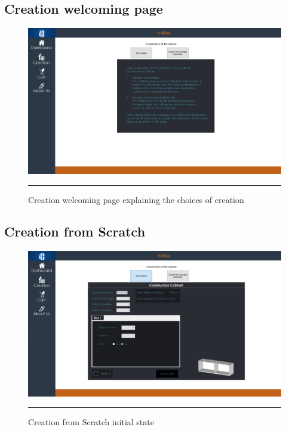 	\newpage
	\subsection{Creation welcoming page}
    	\vfill
        \begin{figure}[h!]
            \centering
    		\includegraphics[width =1.2\textwidth,angle = 90]{Figures/creationWelcome.PNG}
    		\rule{35em}{0.5pt}
    		\caption{Creation welcoming page explaining the choices of creation}
    		\label{welcomtab}
    	\end{figure}
    	\vfill
    	
	\newpage
	\subsection{Creation from Scratch}
    	\vfill
        \begin{figure}[h!]
            \centering
    		\includegraphics[width =1.2\textwidth,angle = 90]{Figures/CreationScratch.PNG}
    		\rule{35em}{0.5pt}
    		\caption{Creation from Scratch initial state}
    		\label{ordertab}
    	\end{figure}
    	\vfill
    	
